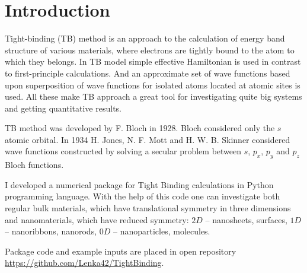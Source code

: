 \chapter{Introduction}
\label{ch:introduction}
Tight-binding (TB) method is an approach to the calculation of energy band structure of various materials, where electrons are tightly bound to the atom to which they belongs. In TB model simple effective Hamiltonian is used in contrast to first-principle calculations. And an approximate set of wave functions based upon superposition of wave functions for isolated atoms located at atomic sites is used. All these make TB approach a great tool for investigating quite big systems and getting quantitative results.

TB method was developed by F. Bloch \cite{bloch} in 1928.  Bloch considered only the $s$ atomic orbital. In 1934 H. Jones, N. F. Mott and H. W. B. Skinner \cite{mott} considered wave functions constructed by solving a secular problem between $s$, $p_x$, $p_y$ and $p_z$ Bloch functions.

I developed a numerical package for Tight Binding calculations in Python programming language. With the help of this code one can investigate both regular bulk materials, which have translational symmetry in three dimensions and nanomaterials, which have reduced symmetry: $2D$ -- nanosheets, surfaces, $1D$ -- nanoribbons, nanorods, $0D$ -- nanoparticles, molecules.

Package code and example inputs are placed in open repository \url{https://github.com/Lenka42/TightBinding}.